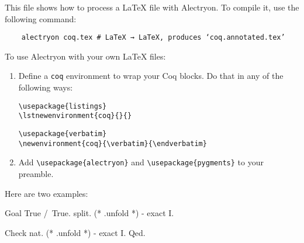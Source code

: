 \documentclass{article}
\begin{document}
This file shows how to process a LaTeX file with Alectryon.  To compile it, use the following command:

\begin{verbatim}
    alectryon coq.tex # LaTeX → LaTeX, produces ‘coq.annotated.tex’
\end{verbatim}

To use Alectryon with your own LaTeX files:

\begin{enumerate}
\item Define a \verb|coq| environment to wrap your Coq blocks.  Do that in any of the following ways:

\begin{verbatim}
\usepackage{listings}
\lstnewenvironment{coq}{}{}
\end{verbatim}

\begin{verbatim}
\usepackage{verbatim}
\newenvironment{coq}{\verbatim}{\endverbatim}
\end{verbatim}

\item Add \verb|\usepackage{alectryon}| and \verb|\usepackage{pygments}| to your preamble.
\end{enumerate}

Here are two examples:
\begin{coq}
Goal True /\ True.
  split. (* .unfold *)
  - exact I.
\end{coq}
\begin{coq}
  Check nat. (* .unfold *)
  - exact I.
Qed.
\end{coq}
\end{document}
